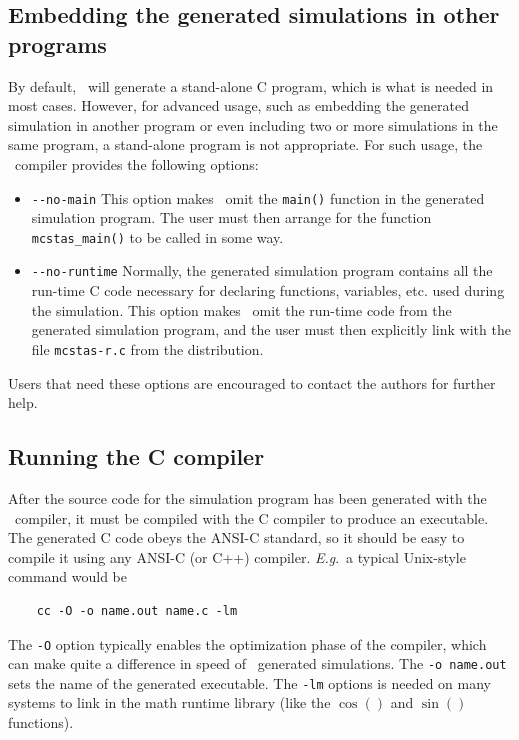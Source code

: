 \subsection{Embedding the generated simulations in other programs}

By default, \MCS\ will generate a stand-alone C program, which is what
is needed in most cases. However, for advanced usage, such as embedding
the generated simulation in another program or even including two or
more simulations in the same program, a stand-alone program is not
appropriate. For such usage, the \MCS\ compiler provides the following
options:
\begin{itemize}
\item \verb+--no-main+ This option makes \MCS\ omit the \verb+main()+
  function in the generated simulation program. The user must then
  arrange for the function \verb+mcstas_main()+ to be called in some
  way.
\item \verb+--no-runtime+ Normally, the
  generated simulation program contains all the run-time C code necessary for
  declaring functions, variables, etc. used during the simulation.  This
  option makes \MCS\ omit the run-time code from the generated
  simulation program, and the user must then explicitly link with the file
  \verb+mcstas-r.c+ from the \MCS{} distribution.
\end{itemize}
Users that need these options are encouraged to contact the authors for
further help.


\subsection{Running the C compiler}


After the source code for the simulation program has been generated with
the \MCS\ compiler, it must be compiled with the C compiler to produce
an executable. The generated C code obeys the ANSI-C standard, so it
should be easy to compile it using any ANSI-C (or C++) compiler. \textit{E.g}.\ a
typical Unix-style command would be
\begin{verbatim}
    cc -O -o name.out name.c -lm
\end{verbatim}
The \verb+-O+ option typically enables the optimization phase of the compiler,
which can make quite a difference in speed of \MCS\ generated simulations. The
\verb+-o name.out+ sets the name of the generated executable. The \verb+-lm+
options is needed on many systems to link in the math runtime library (like the
$\cos()$ and $\sin()$ functions).

